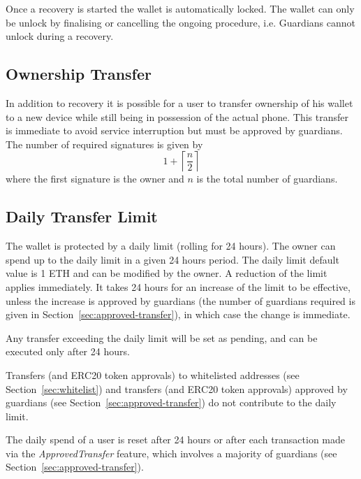 \documentclass[12pt]{article}
\begin{document}
Once a recovery is started the wallet is automatically locked. The wallet can only be unlock by finalising or cancelling the ongoing procedure, i.e. Guardians cannot unlock during a recovery.

\subsection{Ownership Transfer}

In addition to recovery it is possible for a user to transfer ownership of his wallet to a new device while still being in possession of the actual phone. This transfer is immediate to avoid service interruption but must be approved by guardians. The number of required signatures is given by
\begin{equation*}
    1+\left\lceil {\frac{n}{2}} \right\rceil
\end{equation*}
where the first signature is the owner and $n$ is the total number of guardians.

\subsection{Daily Transfer Limit}
\label{sec:dailylimit}
The wallet is protected by a daily limit (rolling for 24 hours). The owner can spend up to the daily limit in a given 24 hours period. The daily limit default value is 1 ETH and can be modified by the owner. A reduction of the limit applies immediately. It takes 24 hours for an increase of the limit to be effective, unless the increase is approved by guardians (the number of guardians required is given in Section~\ref{sec:approved-transfer}), in which case the change is immediate.

Any transfer exceeding the daily limit will be set as pending, and can be executed only after 24 hours.

Transfers (and ERC20 token approvals) to whitelisted addresses (see Section~\ref{sec:whitelist}) and transfers (and ERC20 token approvals) approved by guardians (see Section~\ref{sec:approved-transfer}) do not contribute to the daily limit.

The daily spend of a user is reset after 24 hours or after each transaction made via the \emph{ApprovedTransfer} feature, which involves a majority of guardians (see Section~\ref{sec:approved-transfer}).
\end{document}
